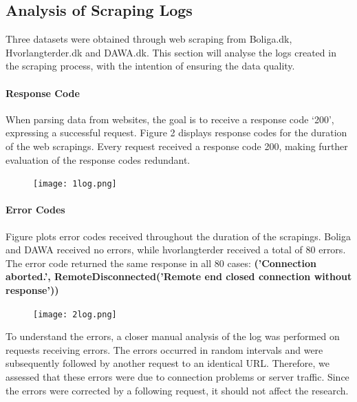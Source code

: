 \documentclass[12pt,a4paper]{article}
\begin{document}
\subsection{Analysis of Scraping Logs}
Three datasets were obtained through web scraping from Boliga.dk, Hvorlangterder.dk and DAWA.dk. This section will analyse the logs created in the scraping process, with the intention of ensuring the data quality.
\paragraph{Response Code\newline}
When parsing data from websites, the goal is to receive a response code ‘200’, expressing a successful request. Figure 2 displays response codes for the duration of the web scrapings. Every request received a response code 200, making further evaluation of the response codes redundant.
\begin{figure}[H]
  \centering
   \caption{}
   \texttt{[image: 1log.png]} 
  \label{fig:}
\end{figure}

\paragraph{Error Codes\newline}
Figure plots error codes received throughout the duration of the scrapings. Boliga and DAWA received no errors, while hvorlangterder received a total of 80 errors. The error code returned the same response in all 80 cases: \small{\textbf{('Connection aborted.', RemoteDisconnected('Remote end closed connection without response'))}}
\normalsize
\begin{figure}[H]
  \centering
   \caption{}
   \texttt{[image: 2log.png]} 
  \label{fig:}
\end{figure}
To understand the errors, a closer manual analysis of the log was performed on requests receiving errors. The errors occurred in random intervals and were subsequently followed by another request to an identical URL. Therefore, we assessed that these errors were due to connection problems or server traffic. Since the errors were corrected by a following request, it should not affect the research.
\end{document}
